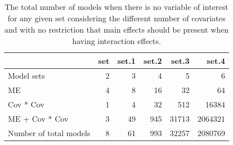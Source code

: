 \begin{table}[!h]
\centering
\caption{The total number of models when there is no variable of interest for any given set considering the different number of covariates and with no restriction that main effects should be present when having interaction effects.} 
\begin{tabular}{lrrrrr}
  \hline
 & set & set.1 & set.2 & set.3 & set.4 \\ 
  \hline
Model sets & 2 & 3 & 4 & 5 & 6 \\ 
  ME & 4 & 8 & 16 & 32 & 64 \\ 
  Cov * Cov & 1 & 4 & 32 & 512 & 16384 \\ 
  ME + Cov * Cov & 3 & 49 & 945 & 31713 & 2064321 \\ 
  Number of total models & 8 & 61 & 993 & 32257 & 2080769 \\ 
   \hline
\end{tabular}
\end{table}
